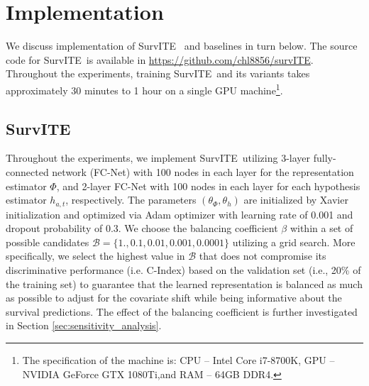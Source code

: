 \documentclass{article}
\newcommand{\proposed}{{SurvITE}}
\begin{document}
\section{Implementation} \newnumbering
We discuss implementation of \proposed~ and baselines in turn below. The source code for \proposed~is available in {\url{https://github.com/chl8856/survITE}}. Throughout the experiments, training \proposed~and its variants takes approximately 30 minutes to 1 hour on a single GPU machine\footnote{The specification of the machine is: CPU – Intel Core i7-8700K, GPU – NVIDIA GeForce GTX 1080Ti,and RAM – 64GB DDR4.}.

\subsection{\proposed}
Throughout the experiments, we implement \proposed~utilizing 3-layer fully-connected network (FC-Net) with 100 nodes in each layer for the representation estimator $\Phi$, and 2-layer FC-Net with 100 nodes in each layer for each hypothesis estimator $h_{a, t}$, respectively. The parameters $(\theta_\Phi, \theta_h)$ are initialized by Xavier initialization \cite{Xavier:10} and optimized via Adam optimizer \cite{Adam:14} with learning rate of 0.001 and dropout probability of 0.3. We choose the balancing coefficient $\beta$ within a set of possible candidates $\mathcal{B} = \{1., 0.1, 0.01, 0.001, 0.0001\}$ utilizing a grid search. More specifically, we select the highest value in $\mathcal{B}$ that does not compromise its discriminative performance (i.e. C-Index) based on the validation set (i.e., 20\% of the training set) to guarantee that the learned representation is balanced as much as possible to adjust for the covariate shift while being informative about the survival predictions. The effect of the balancing coefficient is further investigated in Section \ref{sec:sensitivity_analysis}.
\end{document}
